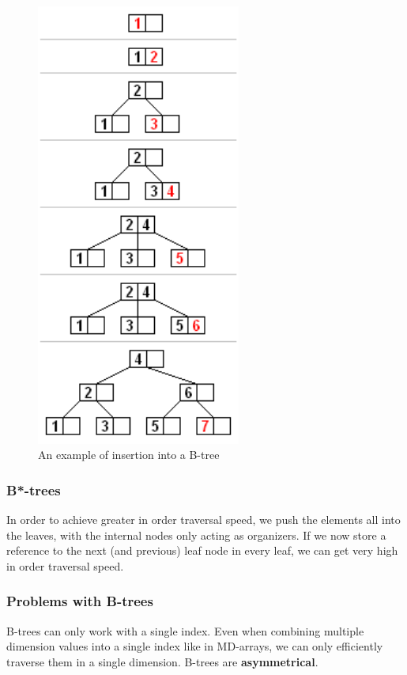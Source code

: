 \documentclass{article}
\begin{document}
\begin{figure}[h!]
    \centering
    \includegraphics[width=0.6\textwidth]{B_tree_insertion_example.png}
    \caption{An example of insertion into a B-tree}
    \label{fig:b_tree}
\end{figure}

\subsubsection{B*-trees}
In order to achieve greater in order traversal speed, we push the elements all into the leaves, with the internal nodes only acting as organizers.
If we now store a reference to the next (and previous) leaf node in every leaf, we can get very high in order traversal speed.

\subsubsection{Problems with B-trees}
B-trees can only work with a single index.
Even when combining multiple dimension values into a single index like in MD-arrays, we can only efficiently traverse them in a single dimension.
B-trees are \textbf{asymmetrical}.
\end{document}
